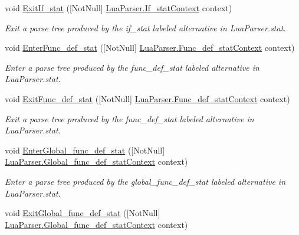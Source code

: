 \begin{DoxyCompactItemize}
void \mbox{\hyperlink{interfacezlua_1_1_i_lua_listener_a2f0389129d1846cafed21b068ecdb15d}{Exit\+If\+\_\+stat}} (\mbox{[}Not\+Null\mbox{]} \mbox{\hyperlink{classzlua_1_1_lua_parser_1_1_if__stat_context}{Lua\+Parser.\+If\+\_\+stat\+Context}} context)
\begin{DoxyCompactList}\small\item\em Exit a parse tree produced by the {\ttfamily if\+\_\+stat} labeled alternative in Lua\+Parser.\+stat. \end{DoxyCompactList}\item 
void \mbox{\hyperlink{interfacezlua_1_1_i_lua_listener_a2f03132612731ef3355f1453b3cb4686}{Enter\+Func\+\_\+def\+\_\+stat}} (\mbox{[}Not\+Null\mbox{]} \mbox{\hyperlink{classzlua_1_1_lua_parser_1_1_func__def__stat_context}{Lua\+Parser.\+Func\+\_\+def\+\_\+stat\+Context}} context)
\begin{DoxyCompactList}\small\item\em Enter a parse tree produced by the {\ttfamily func\+\_\+def\+\_\+stat} labeled alternative in Lua\+Parser.\+stat. \end{DoxyCompactList}\item 
void \mbox{\hyperlink{interfacezlua_1_1_i_lua_listener_a223ff1fef03cefaf9758254c32011257}{Exit\+Func\+\_\+def\+\_\+stat}} (\mbox{[}Not\+Null\mbox{]} \mbox{\hyperlink{classzlua_1_1_lua_parser_1_1_func__def__stat_context}{Lua\+Parser.\+Func\+\_\+def\+\_\+stat\+Context}} context)
\begin{DoxyCompactList}\small\item\em Exit a parse tree produced by the {\ttfamily func\+\_\+def\+\_\+stat} labeled alternative in Lua\+Parser.\+stat. \end{DoxyCompactList}\item 
void \mbox{\hyperlink{interfacezlua_1_1_i_lua_listener_add4d956e68d0679849896d682e181800}{Enter\+Global\+\_\+func\+\_\+def\+\_\+stat}} (\mbox{[}Not\+Null\mbox{]} \mbox{\hyperlink{classzlua_1_1_lua_parser_1_1_global__func__def__stat_context}{Lua\+Parser.\+Global\+\_\+func\+\_\+def\+\_\+stat\+Context}} context)
\begin{DoxyCompactList}\small\item\em Enter a parse tree produced by the {\ttfamily global\+\_\+func\+\_\+def\+\_\+stat} labeled alternative in Lua\+Parser.\+stat. \end{DoxyCompactList}\item 
void \mbox{\hyperlink{interfacezlua_1_1_i_lua_listener_a13e62813408bab9b10861e768a3c5ca1}{Exit\+Global\+\_\+func\+\_\+def\+\_\+stat}} (\mbox{[}Not\+Null\mbox{]} \mbox{\hyperlink{classzlua_1_1_lua_parser_1_1_global__func__def__stat_context}{Lua\+Parser.\+Global\+\_\+func\+\_\+def\+\_\+stat\+Context}} context)

\end{DoxyCompactItemize}
